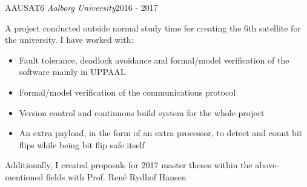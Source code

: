 
\begin{projects}
	\project
	{AAUSAT6 {\it Aalborg University}}{2016 - 2017}
	{}
	{A project conducted outside normal study time for creating the 6th satellite for the university. I have worked with:
        \begin{itemize}
        \item Fault tolerance, deadlock avoidance and formal/model verification of the software mainly in UPPAAL
        \item Formal/model verification of the communications protocol 
        \item Version control and continuous build system for the whole project
        \item An extra payload, in the form of an extra processor, to detect and count bit flips while being bit flip safe itself
        \end{itemize}
    Additionally, I created proposals for 2017 master theses within the above-mentioned fields with Prof. René Rydhof Hansen}
	{}
\end{projects}